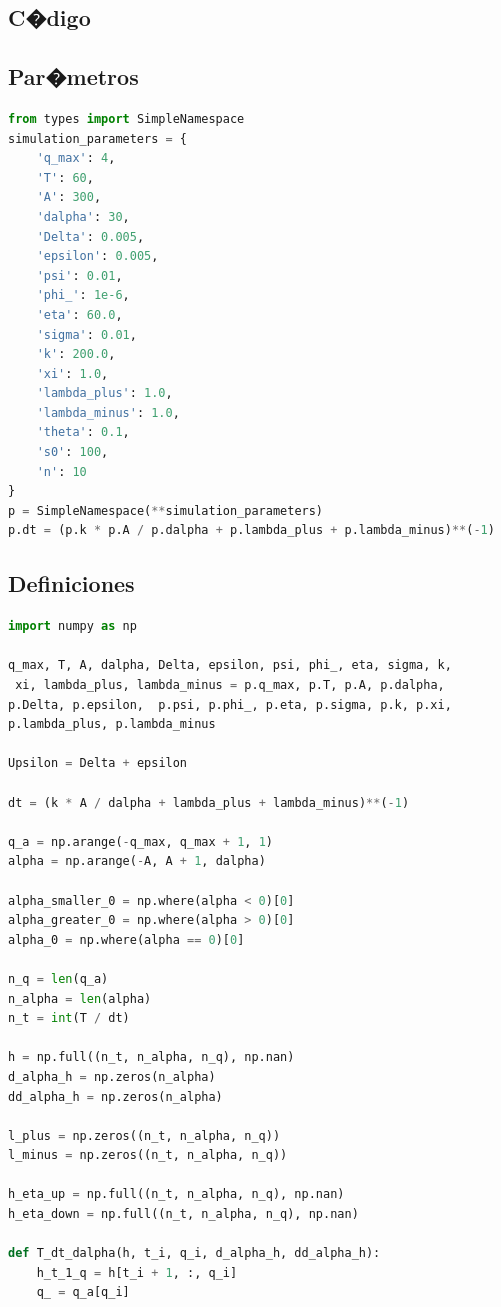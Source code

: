 \documentclass[12pt,a4paper,spanish]{article}%
\begin{document}
\begin{appendices}
\section{C�digo} \label{sec:codigo}
\subsection{Par�metros}
\begin{lstlisting}[language=Python]
from types import SimpleNamespace
simulation_parameters = {
	'q_max': 4,
	'T': 60,
	'A': 300,
	'dalpha': 30,
	'Delta': 0.005,
	'epsilon': 0.005,
	'psi': 0.01,
	'phi_': 1e-6,
	'eta': 60.0,
	'sigma': 0.01,
	'k': 200.0,
	'xi': 1.0,
	'lambda_plus': 1.0,
	'lambda_minus': 1.0,
	'theta': 0.1,
	's0': 100,
	'n': 10
}
p = SimpleNamespace(**simulation_parameters)
p.dt = (p.k * p.A / p.dalpha + p.lambda_plus + p.lambda_minus)**(-1)
\end{lstlisting}
\subsection{Definiciones}
\begin{lstlisting}[language=Python]
import numpy as np

q_max, T, A, dalpha, Delta, epsilon, psi, phi_, eta, sigma, k,
 xi, lambda_plus, lambda_minus = p.q_max, p.T, p.A, p.dalpha,
p.Delta, p.epsilon,  p.psi, p.phi_, p.eta, p.sigma, p.k, p.xi,
p.lambda_plus, p.lambda_minus

Upsilon = Delta + epsilon

dt = (k * A / dalpha + lambda_plus + lambda_minus)**(-1)

q_a = np.arange(-q_max, q_max + 1, 1)
alpha = np.arange(-A, A + 1, dalpha)

alpha_smaller_0 = np.where(alpha < 0)[0]
alpha_greater_0 = np.where(alpha > 0)[0]
alpha_0 = np.where(alpha == 0)[0]   

n_q = len(q_a)
n_alpha = len(alpha)
n_t = int(T / dt)

h = np.full((n_t, n_alpha, n_q), np.nan)
d_alpha_h = np.zeros(n_alpha)
dd_alpha_h = np.zeros(n_alpha)

l_plus = np.zeros((n_t, n_alpha, n_q))
l_minus = np.zeros((n_t, n_alpha, n_q))

h_eta_up = np.full((n_t, n_alpha, n_q), np.nan)
h_eta_down = np.full((n_t, n_alpha, n_q), np.nan)

def T_dt_dalpha(h, t_i, q_i, d_alpha_h, dd_alpha_h):
    h_t_1_q = h[t_i + 1, :, q_i]
    q_ = q_a[q_i]


\end{lstlisting}
\end{appendices}
\end{document}
